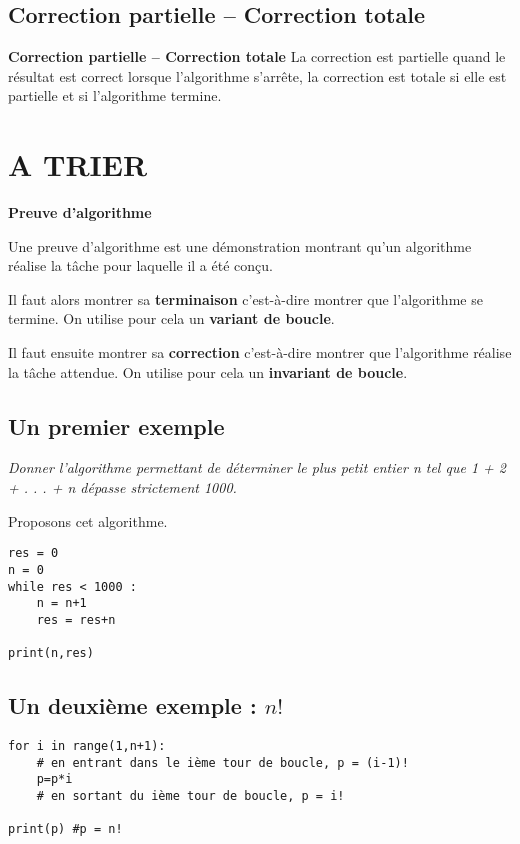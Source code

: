 \subsection{Correction partielle -- Correction totale}
\begin{defi}\textbf{Correction partielle -- Correction totale}
La correction est partielle quand le résultat est correct lorsque l'algorithme s'arrête, la correction est totale si elle est partielle et si l'algorithme termine.
\end{defi}

\newpage
\section{A TRIER}

\begin{defi} 
\textbf{Preuve d'algorithme}

Une preuve d'algorithme est une démonstration montrant qu'un algorithme réalise la tâche pour laquelle il a été conçu. 

Il faut alors montrer sa \textbf{terminaison} c'est-à-dire montrer que l'algorithme se termine. On utilise pour cela un \textbf{variant de boucle}.

Il faut ensuite montrer sa \textbf{correction} c'est-à-dire montrer que l'algorithme réalise la tâche attendue. On utilise pour cela un \textbf{invariant de boucle}.
\end{defi}



\subsection{Un premier exemple}

\textit{Donner l'algorithme permettant de déterminer le plus petit entier n tel que 1 + 2 + . . . + n dépasse strictement 1000.}

Proposons cet algorithme.
\begin{lstlisting}
res = 0
n = 0
while res < 1000 : 
    n = n+1
    res = res+n
    
print(n,res)
\end{lstlisting}

\subsection{Un deuxième exemple : $n!$}

\begin{lstlisting}
for i in range(1,n+1):
    # en entrant dans le ième tour de boucle, p = (i-1)!
    p=p*i
    # en sortant du ième tour de boucle, p = i!

print(p) #p = n!
\end{lstlisting}

